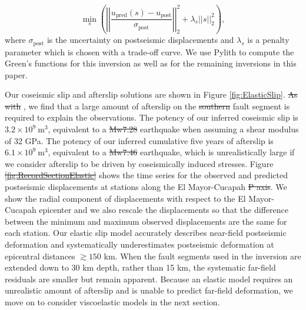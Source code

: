 \documentclass[draft,linenumbers]{AGUJournal}
\providecommand{\DIFadd}[1]{{\protect\color{blue}\uwave{#1}}} %
\providecommand{\DIFdel}[1]{{\protect\color{red}\sout{#1}}}                      %
\providecommand{\DIFaddbegin}{} %
\providecommand{\DIFaddend}{} %
\providecommand{\DIFdelbegin}{} %
\providecommand{\DIFdelend}{} %
\begin{document}
\begin{equation}\label{eq:ElasticObjective}
  \min_s \left(\left|\left|\frac{u_\mathrm{pred}(s) - u_\mathrm{post}}                
                                {\sigma_\mathrm{post}}\right|\right|_2^2 + 
                                \lambda_s||s||_2^2\right),
\end{equation}
where $\sigma_\mathrm{post}$ is the uncertainty on postseismic displacements and $\lambda_s$ is a penalty parameter which is chosen with a trade-off curve.  We use Pylith \citep{Aagaard2013} to compute the Green's functions for this inversion as well as for the remaining inversions in this paper. 

Our coseismic slip and afterslip solutions are shown in Figure \ref{fig:ElasticSlip}.  \DIFdelbegin \DIFdel{As with }\DIFdelend \DIFaddbegin \DIFadd{Similar to }\DIFaddend \citet{Rollins2015}, we find that a large amount of afterslip on the \DIFdelbegin \DIFdel{southern }\DIFdelend \DIFaddbegin \DIFadd{Indiviso }\DIFaddend fault segment is required to explain the observations. The potency of our inferred coseismic slip is $3.2\times10^9\ \mathrm{m}^3$, equivalent to a \DIFdelbegin \DIFdel{Mw7.28 }\DIFdelend \DIFaddbegin \DIFadd{Mw=7.28 }\DIFaddend earthquake when assuming a shear modulus of 32 GPa.  The potency of our inferred cumulative five years of afterslip is $6.1\times10^9\ \mathrm{m}^3$, equivalent to a \DIFdelbegin \DIFdel{Mw7.46 }\DIFdelend \DIFaddbegin \DIFadd{Mw=7.46 }\DIFaddend earthquake, which is unrealistically large if we consider afterslip to be driven by coseismically induced stresses.  Figure \DIFdelbegin \DIFdel{\ref{fig:RecordSectionElastic} }\DIFdelend \DIFaddbegin \DIFadd{\ref{fig:RecordSectionMain} }\DIFaddend shows the time series for the observed and predicted postseismic displacements at stations along the El Mayor-Cucapah \DIFdelbegin \DIFdel{P axis}\DIFdelend \DIFaddbegin \DIFadd{P-axis}\DIFaddend .  We show the radial component of displacements with respect to the El Mayor-Cucapah epicenter and we also rescale the displacements so that the difference between the minimum and maximum observed displacements are the same for each station.  Our elastic slip model accurately describes near-field postseismic deformation and systematically underestimates postseismic deformation at epicentral distances ${\gtrsim}150$ km.  When the fault segments used in the inversion are extended down to 30 km depth, rather than 15 km, the systematic far-field residuals are smaller but remain apparent. Because an elastic model requires an unrealistic amount of afterslip and is unable to predict far-field deformation, we move on to consider viscoelastic models in the next section.  
\end{document}
